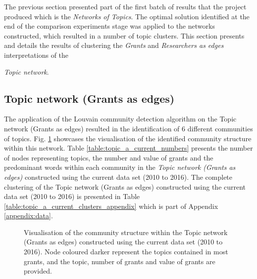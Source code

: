 The previous section presented part of the first batch of results that the project produced which is the \textit{Networks of Topics}. The optimal solution identified at the end of the comparison experiments stage was applied to the networks constructed, which resulted in a number of topic clusters. This section presents and details the results of clustering the \textit{Grants} and \textit{Researchers as edges} interpretations of the {\textit{Topic network}.

\subsection{Topic network (Grants as edges)}

The application of the Louvain community detection algorithm on the Topic network (Grants as edges) resulted in the identification of 6 different communities of topics. Fig. \ref{fig:topic_a_current_cs} showcases the visualisation of the identified community structure within this network. Table \ref{table:topic_a_current_numbers} presents the number of nodes representing topics, the number and value of grants and the predominant words within each community in the \textit{Topic network (Grants as edges)} constructed using the current data set (2010 to 2016). The complete clustering of the Topic network (Grants as edges) constructed using the current data set (2010 to 2016) is presented in Table \ref{table:topic_a_current_clusters_appendix} which is part of Appendix \ref{appendix:data}.

\begin{figure}[htpb]
    \centering
    \caption[Visualisation of the community structure within the Topic network (Grants as edges) constructed using the current data set (2010 to 2016).]{Visualisation of the community structure within the Topic network (Grants as edges) constructed using the current data set (2010 to 2016). Node coloured darker represent the topics contained in most grants, and the topic, number of grants and value of grants are provided.}
    \label{fig:topic_a_current_cs}
\end{figure}

}

